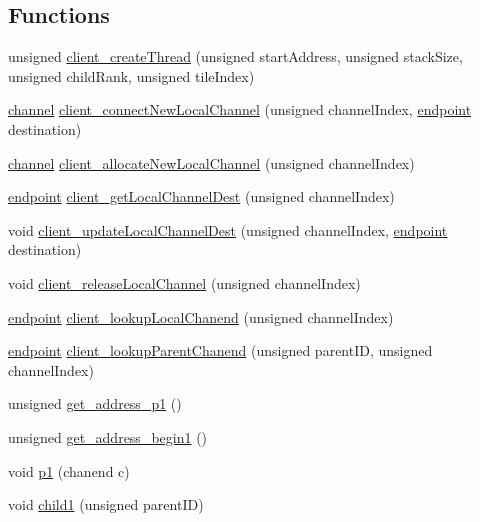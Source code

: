 \subsection*{Functions}
\begin{DoxyCompactItemize}
\item 
unsigned \hyperlink{_swallow-n_o_s__client_8xc_a9c19ca20ad2461ff190f3d25f45c146d}{client\+\_\+create\+Thread} (unsigned start\+Address, unsigned stack\+Size, unsigned child\+Rank, unsigned tile\+Index)
\item 
\hyperlink{_swallow-helpers_8h_aa6ea79b51cb1a11714e12ddd689dd15c}{channel} \hyperlink{_swallow-n_o_s__client_8xc_a6936b888ab1416c7d5d6f95ed9fc606a}{client\+\_\+connect\+New\+Local\+Channel} (unsigned channel\+Index, \hyperlink{_swallow-helpers_8h_ab1358ba323e68c233f100abc11bdc7ea}{endpoint} destination)
\item 
\hyperlink{_swallow-helpers_8h_aa6ea79b51cb1a11714e12ddd689dd15c}{channel} \hyperlink{_swallow-n_o_s__client_8xc_a4984ae0186883d0688f0bfdbebbcbca6}{client\+\_\+allocate\+New\+Local\+Channel} (unsigned channel\+Index)
\item 
\hyperlink{_swallow-helpers_8h_ab1358ba323e68c233f100abc11bdc7ea}{endpoint} \hyperlink{_swallow-n_o_s__client_8xc_a5a8640c5003b3c5ecae959408ec3296a}{client\+\_\+get\+Local\+Channel\+Dest} (unsigned channel\+Index)
\item 
void \hyperlink{_swallow-n_o_s__client_8xc_a64b8d179533337ed89f213bd716c3e27}{client\+\_\+update\+Local\+Channel\+Dest} (unsigned channel\+Index, \hyperlink{_swallow-helpers_8h_ab1358ba323e68c233f100abc11bdc7ea}{endpoint} destination)
\item 
void \hyperlink{_swallow-n_o_s__client_8xc_a12c5cb8b4a5cac908bdb6c8db3ec5589}{client\+\_\+release\+Local\+Channel} (unsigned channel\+Index)
\item 
\hyperlink{_swallow-helpers_8h_ab1358ba323e68c233f100abc11bdc7ea}{endpoint} \hyperlink{_swallow-n_o_s__client_8xc_ae2ecc339710d5a5e526001f3dba37d16}{client\+\_\+lookup\+Local\+Chanend} (unsigned channel\+Index)
\item 
\hyperlink{_swallow-helpers_8h_ab1358ba323e68c233f100abc11bdc7ea}{endpoint} \hyperlink{_swallow-n_o_s__client_8xc_a382d0d1a4ba77407e420019041197d66}{client\+\_\+lookup\+Parent\+Chanend} (unsigned parent\+I\+D, unsigned channel\+Index)
\item 
unsigned \hyperlink{_swallow-n_o_s__client_8xc_a47640fc90ff568b533db996ac617780a}{get\+\_\+address\+\_\+p1} ()
\item 
unsigned \hyperlink{_swallow-n_o_s__client_8xc_ad257ca8e985e2e3f2add732fd54401f1}{get\+\_\+address\+\_\+begin1} ()
\item 
void \hyperlink{_swallow-n_o_s__client_8xc_ab11ec376676a15d81007529e95b1282d}{p1} (chanend c)
\item 
void \hyperlink{_swallow-n_o_s__client_8xc_ac1c4002ae3ece3f5e4ecd100efca5223}{child1} (unsigned parent\+I\+D)
\end{DoxyCompactItemize}


